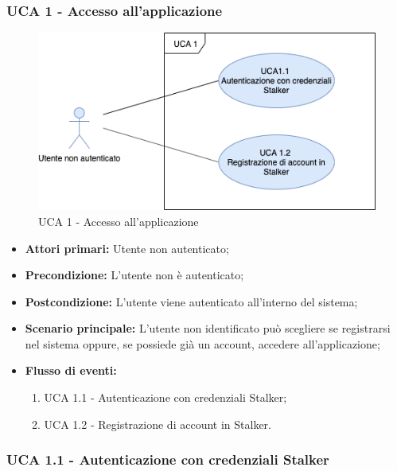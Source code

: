 \subsubsection{UCA 1 - Accesso all'applicazione}%

\begin{figure}[h]
  \centering
    \includegraphics[scale=0.8]{sezioni/UseCase/Immagini/Panoramica.png}
  \caption{UCA 1 -  Accesso all'applicazione}
\end{figure}

\begin{itemize}
\item \textbf{Attori primari:} Utente non autenticato;
\item \textbf{Precondizione:} L'utente non è autenticato;
\item \textbf{Postcondizione:} L'utente viene autenticato all'interno del sistema;
\item \textbf{Scenario principale:} L'utente non identificato può scegliere se registrarsi nel sistema oppure, se possiede già un account, accedere all'applicazione; %
\item \textbf{Flusso di eventi:}
    \begin{enumerate}
        \item UCA 1.1 - Autenticazione con credenziali Stalker;
        \item UCA 1.2 - Registrazione di account in Stalker.
    \end{enumerate}

\end{itemize}

\subsubsection{UCA 1.1 - Autenticazione con credenziali Stalker}%

